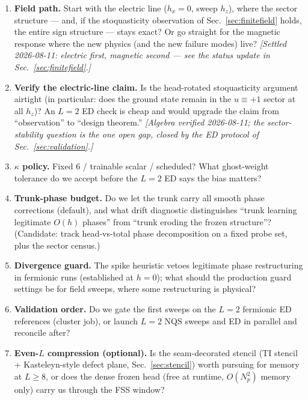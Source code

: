 \documentclass[11pt]{article}
\begin{document}
\begin{enumerate}
\item \textbf{Field path.} Start with the electric line ($h_x=0$, sweep
$h_z$), where the sector structure --- and, if the stoquasticity observation
of Sec.~\ref{sec:finitefield} holds, the entire sign structure --- stays
exact? Or go straight for the magnetic response where the new physics (and
the new failure modes) live? \emph{[Settled 2026-08-11: electric first,
magnetic second --- see the status update in Sec.~\ref{sec:finitefield}.]}
\item \textbf{Verify the electric-line claim.} Is the head-rotated
stoquasticity argument airtight (in particular: does the ground state remain
in the $u\equiv+1$ sector at all $h_z$)? An $L=2$ ED check is cheap and
would upgrade the claim from ``observation'' to ``design theorem.''
\emph{[Algebra verified 2026-08-11; the sector-stability question is the one
open gap, closed by the ED protocol of Sec.~\ref{sec:validation}.]}
\item \textbf{$\kappa$ policy.} Fixed 6 / trainable scalar / scheduled? What
ghost-weight tolerance do we accept before the $L=2$ ED says the bias
matters?
\item \textbf{Trunk-phase budget.} Do we let the trunk carry all smooth
phase corrections (default), and what drift diagnostic distinguishes
``trunk learning legitimate $O(h)$ phases'' from ``trunk eroding the frozen
structure''? (Candidate: track head-vs-total phase decomposition on a fixed
probe set, plus the sector census.)
\item \textbf{Divergence guard.} The spike heuristic vetoes legitimate phase
restructuring in fermionic runs (established at $h=0$); what should the
production guard settings be for field sweeps, where some restructuring is
physical?
\item \textbf{Validation order.} Do we gate the first sweeps on the $L=2$
fermionic ED references (cluster job), or launch $L=2$ NQS sweeps and ED in
parallel and reconcile after?
\item \textbf{Even-$L$ compression (optional).} Is the seam-decorated
stencil (TI stencil + Kasteleyn-style defect plane,
Sec.~\ref{sec:stencil}) worth pursuing for memory at $L\ge8$, or does the
dense frozen head (free at runtime, $O(N_p^2)$ memory only) carry us through
the FSS window?
\end{enumerate}
\end{document}
